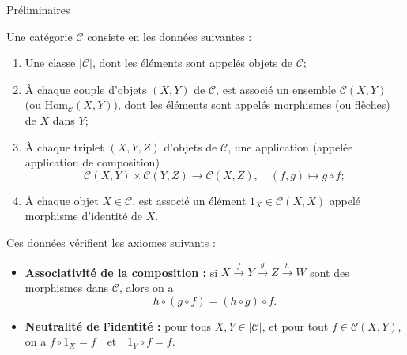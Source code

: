 \documentclass[9pt]{beamer}
\begin{document}
	
	
	
	\begin{frame}{Préliminaires}
	\begin{definition}
		Une catégorie \( \mathcal{C} \) consiste en les données suivantes :
		\begin{enumerate}[label=\roman*)]
			\item Une classe \( |\mathcal{C}| \), dont les éléments sont appelés objets de \( \mathcal{C} \);
			\item À chaque couple d'objets \( (X, Y) \) de \( \mathcal{C} \), est associé un ensemble \( \mathcal{C}(X, Y) \) (ou \( \mathrm{Hom}_{\mathcal{C}}(X, Y) \)), dont les éléments sont appelés morphismes (ou flèches) de \( X \) dans \( Y \);
			\item À chaque triplet \( (X, Y, Z) \) d'objets de \( \mathcal{C} \), une application (appelée application de composition)
			\[
			\mathcal{C}(X, Y) \times \mathcal{C}(Y, Z) \to \mathcal{C}(X, Z), \quad (f, g) \mapsto g \circ f;
			\]
			\item À chaque objet \( X \in \mathcal{C} \), est associé un élément \( 1_X \in \mathcal{C}(X, X) \) appelé morphisme d'identité de \( X \).
		\end{enumerate}
		Ces données vérifient les axiomes suivants :
		\begin{itemize}
			\item \textbf{Associativité de la composition :}
			si \( X \xrightarrow{f} Y \xrightarrow{g} Z \xrightarrow{h} W \) sont des morphismes dans \( \mathcal{C} \), alors on a
			\[
			h \circ (g \circ f) = (h \circ g) \circ f.
			\]
			\item \textbf{Neutralité de l'identité :}
			pour tous \( X, Y \in |\mathcal{C}| \), et pour tout \( f \in \mathcal{C}(X, Y) \), on a
			\(f \circ 1_{X} = f \quad \text{et} \quad 1_{Y} \circ f = f.\)
		\end{itemize}
	\end{definition}
	\end{frame}
	
\end{document}
